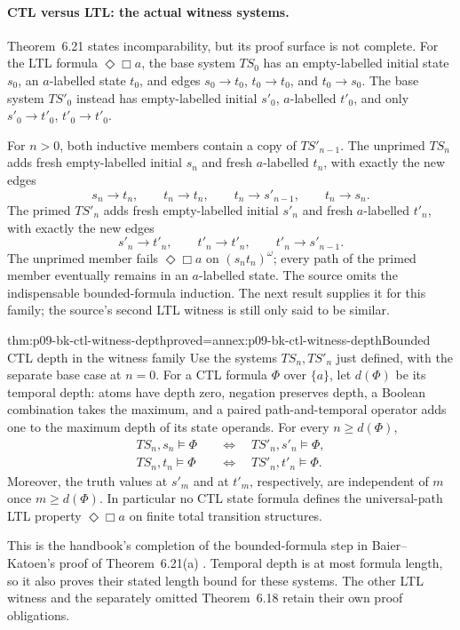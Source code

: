 \paragraph{CTL versus LTL: the actual witness systems.}
Theorem~6.21 states incomparability, but its proof surface is not complete.
For the LTL formula \(\Diamond\Box a\), the base system \(TS_0\) has an
empty-labelled initial state \(s_0\), an \(a\)-labelled state \(t_0\), and
edges \(s_0\to t_0\), \(t_0\to t_0\), and \(t_0\to s_0\).  The base system
\(TS'_0\) instead has empty-labelled initial \(s'_0\), \(a\)-labelled
\(t'_0\), and only \(s'_0\to t'_0\), \(t'_0\to t'_0\).

For \(n>0\), both inductive members contain a copy of \(TS'_{n-1}\).
The unprimed \(TS_n\) adds fresh empty-labelled initial \(s_n\) and fresh
\(a\)-labelled \(t_n\), with exactly the new edges
\[
 s_n\to t_n,\qquad t_n\to t_n,
 \qquad t_n\to s'_{n-1},\qquad t_n\to s_n.
\]
The primed \(TS'_n\) adds fresh empty-labelled initial \(s'_n\) and fresh
\(a\)-labelled \(t'_n\), with exactly the new edges
\[
 s'_n\to t'_n,\qquad t'_n\to t'_n,
 \qquad t'_n\to s'_{n-1}.
\]
The unprimed member fails \(\Diamond\Box a\) on
\((s_nt_n)^\omega\); every path of the primed member eventually remains in
an \(a\)-labelled state. The source omits the indispensable bounded-formula
induction. The next result supplies it for this family; the source's second
LTL witness is still only said to be similar.

\begin{hbtheorem}{thm:p09-bk-ctl-witness-depth}{proved=annex:p09-bk-ctl-witness-depth}{Bounded CTL depth in the witness family}
Use the systems \(TS_n,TS'_n\) just defined, with the separate base
case at \(n=0\). For a CTL formula \(\Phi\) over \(\{a\}\), let
\(d(\Phi)\) be its temporal depth: atoms have depth zero, negation
preserves depth, a Boolean combination takes the maximum, and a paired
path-and-temporal operator adds one to the maximum depth of its state
operands. For every \(n\geq d(\Phi)\),
\[
\begin{aligned}
 TS_n,s_n\models\Phi&\quad\Longleftrightarrow\quad TS'_n,s'_n\models\Phi,\\
 TS_n,t_n\models\Phi&\quad\Longleftrightarrow\quad TS'_n,t'_n\models\Phi.
\end{aligned}
\]
Moreover, the truth values at \(s'_m\) and at \(t'_m\), respectively,
are independent of \(m\) once \(m\geq d(\Phi)\). In particular no
CTL state formula defines the universal-path LTL property
\(\Diamond\Box a\) on finite total transition structures.

This is the handbook's completion of the bounded-formula step in
Baier--Katoen's proof of Theorem~6.21(a)
\cite[pp.~337--340]{BaierKatoen2008}. Temporal depth is at most formula
length, so it also proves their stated length bound for these systems.
The other LTL witness and the separately omitted Theorem~6.18 retain
their own proof obligations.
\end{hbtheorem}


